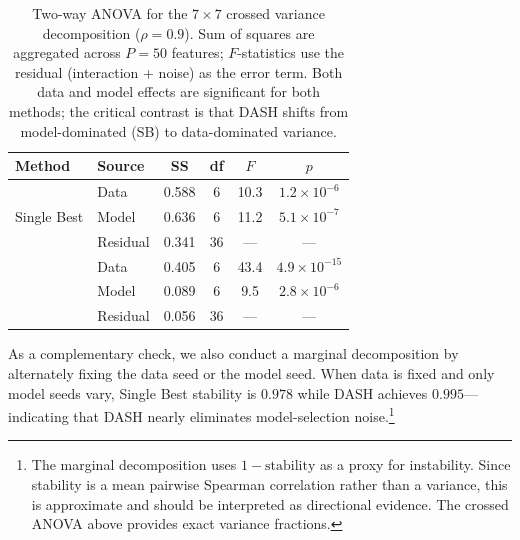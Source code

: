 \documentclass[11pt]{article}
\newcommand{\dash}{\textsc{DASH}}
\newcommand{\rhovar}{\rho}
\begin{document}
\begin{table}[htbp]
\centering
\caption{Two-way ANOVA for the $7 \times 7$ crossed variance
decomposition ($\rhovar = 0.9$). Sum of squares are aggregated across
$P = 50$ features; $F$-statistics use the residual (interaction +
noise) as the error term.\protect\footnotemark{}
Both data and model effects are significant for both
methods; the critical contrast is that \dash{} shifts from
model-dominated (SB) to data-dominated variance.}
\label{tab:anova}
\small
\begin{tabular}{llcccc}
\toprule
\textbf{Method} & \textbf{Source} & \textbf{SS} & \textbf{df} & $F$ & $p$ \\
\midrule
\multirow{3}{*}{Single Best}
  & Data     & 0.588 & 6  & 10.3 & $1.2 \times 10^{-6}$ \\
  & Model    & 0.636 & 6  & 11.2 & $5.1 \times 10^{-7}$ \\
  & Residual & 0.341 & 36 & ---  & --- \\
\addlinespace
\multirow{3}{*}{\dash{} (MaxMin)}
  & Data     & 0.405 & 6  & 43.4 & $4.9 \times 10^{-15}$ \\
  & Model    & 0.089 & 6  & \phantom{0}9.5 & $2.8 \times 10^{-6}$ \\
  & Residual & 0.056 & 36 & ---  & --- \\
\bottomrule
\end{tabular}
\end{table}

As a complementary check, we also conduct a marginal decomposition by
alternately fixing the data seed or the model seed. When data is fixed
and only model seeds vary, Single Best stability is $0.978$ while
\dash{} achieves $0.995$---indicating that \dash{} nearly eliminates
model-selection noise.\footnote{The marginal decomposition uses
$1 - \text{stability}$ as a proxy for instability. Since stability is a
mean pairwise Spearman correlation rather than a variance, this is
approximate and should be interpreted as directional evidence. The
crossed ANOVA above provides exact variance fractions.}
\end{document}
